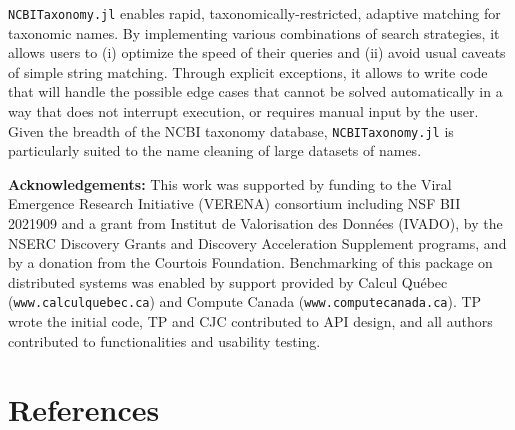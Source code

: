 \documentclass[10pt,oneside]{article}
\begin{document}
\texttt{NCBITaxonomy.jl} enables rapid, taxonomically-restricted,
adaptive matching for taxonomic names. By implementing various
combinations of search strategies, it allows users to (i) optimize the
speed of their queries and (ii) avoid usual caveats of simple string
matching. Through explicit exceptions, it allows to write code that will
handle the possible edge cases that cannot be solved automatically in a
way that does not interrupt execution, or requires manual input by the
user. Given the breadth of the NCBI taxonomy database,
\texttt{NCBITaxonomy.jl} is particularly suited to the name cleaning of
large datasets of names.

\textbf{Acknowledgements:} This work was supported by funding to the
Viral Emergence Research Initiative (VERENA) consortium including NSF
BII 2021909 and a grant from Institut de Valorisation des Données
(IVADO), by the NSERC Discovery Grants and Discovery Acceleration
Supplement programs, and by a donation from the Courtois Foundation.
Benchmarking of this package on distributed systems was enabled by
support provided by Calcul Québec (\texttt{www.calculquebec.ca}) and
Compute Canada (\texttt{www.computecanada.ca}). TP wrote the initial
code, TP and CJC contributed to API design, and all authors contributed
to functionalities and usability testing.

\hypertarget{references}{%
\section*{References}\label{references}}
\end{document}
